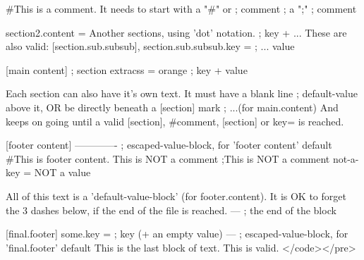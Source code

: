 #This is a comment. It needs to start with a "#" or                     ; comment
; a ";"                                                                 ; comment

section2.content = Another sections, using 'dot' notation.              ; key + ...
These are also valid: [section.sub.subsub], section.sub.subsub.key =    ;      ... value

[main content]                                                          ; section
extracss = orange                                                       ; key + value

Each section can also have it's own text. It must have a blank line     ; default-value 
above it, OR be directly beneath a [section] mark                       ; ...(for main.content)
And keeps on going until a valid [section], #comment, [section] or key=
is reached.

[footer content]
-------------                                        ; escaped-value-block, for 'footer content' default
#This is footer content. This is NOT a comment
;This is NOT a comment
not-a-key = NOT a value

All of this text is a 'default-value-block' (for footer.content). It is OK
to forget the 3 dashes below, if the end of the file is reached.
---         ; the end of the block

[final.footer]
some.key =                                           ; key (+ an empty value)
---                                                  ; escaped-value-block, for 'final.footer' default
This is the last block of text. 
This is valid.
</code></pre>






